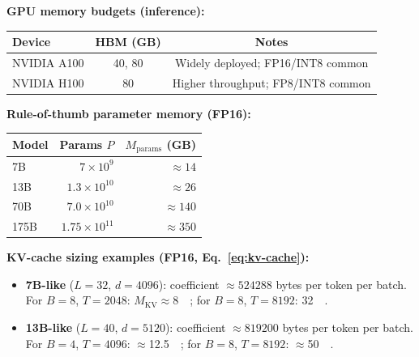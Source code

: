 \begin{tcolorbox}[
  title={\textbf{Capacity Planning: A100/H100 Quick Rules}},
  colback=gray!5,
  colframe=gray!60!black,
  colbacktitle=gray!20,
  coltitle=black,
  fonttitle=\bfseries,
  boxrule=0.7pt,
  arc=4pt,
  left=5mm, right=5mm, top=4mm, bottom=4mm,
  before skip=6pt,
  after skip=6pt,
  breakable
]
\small
\noindent\textbf{GPU memory budgets (inference):}
\begin{center}
\setlength{\tabcolsep}{5pt}
\begin{tabular}{lcc}
\toprule
Device & HBM (GB) & Notes \\
\midrule
NVIDIA A100 & 40, 80 & Widely deployed; FP16/INT8 common \\
NVIDIA H100 & 80     & Higher throughput; FP8/INT8 common \\
\bottomrule
\end{tabular}
\end{center}

\medskip
\noindent\textbf{Rule-of-thumb parameter memory (FP16):}
\begin{center}
\setlength{\tabcolsep}{5pt}
\begin{tabular}{lrr}
\toprule
Model & Params $P$ & $M_{\text{params}}$ (GB) \\
\midrule
7B    & $7\!\times\!10^9$   & $\approx 14$ \\
13B   & $1.3\!\times\!10^{10}$ & $\approx 26$ \\
70B   & $7.0\!\times\!10^{10}$ & $\approx 140$ \\
175B  & $1.75\!\times\!10^{11}$ & $\approx 350$ \\
\bottomrule
\end{tabular}
\end{center}

\medskip
\noindent\textbf{KV-cache sizing examples (FP16, Eq.~\ref{eq:kv-cache}):}
\begin{itemize}[leftmargin=1.2em, itemsep=2pt]
\item \textbf{7B-like} ($L{=}32$, $d{=}4096$): coefficient $\approx \num{524288}$ bytes per token per batch. For $B{=}8$, $T{=}2048$: $M_{\text{KV}}\approx$\SI{8}{\gibi\byte}; for $B{=}8$, $T{=}8192$: \SI{32}{\gibi\byte}.
\item \textbf{13B-like} ($L{=}40$, $d{=}5120$): coefficient $\approx \num{819200}$ bytes per token per batch. For $B{=}4$, $T{=}4096$: $\approx$\SI{12.5}{\gibi\byte}; for $B{=}8$, $T{=}8192$: $\approx$\SI{50}{\gibi\byte}.
\end{itemize}


\end{tcolorbox}
